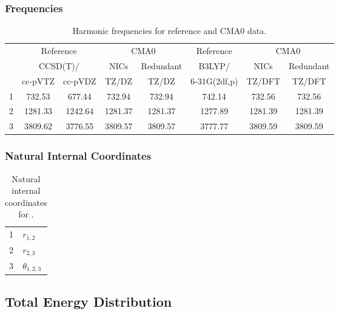 \documentclass[10pt,oneside]{article}
\begin{document}
\begin{table}[h!]
\subsubsection*{Frequencies}
\centering
\caption{Harmonic frequencies for reference and CMA0 data.}
\begin{tabular}{cccccccc}
\toprule
{} & \multicolumn{2}{c}{Reference} & \multicolumn{2}{c}{CMA0} &    Reference & \multicolumn{2}{c}{CMA0} \\
{} & \multicolumn{2}{c}{CCSD(T)/} &    NICs &  Redundant &       B3LYP/ &    NICs & Redundant \\
{} &   cc-pVTZ & cc-pVDZ &   TZ/DZ &      TZ/DZ & 6-31G(2df,p) &  TZ/DFT &    TZ/DFT \\
\midrule
1 &    732.53 &  677.44 &  732.94 &     732.94 &       742.14 &  732.56 &    732.56 \\
2 &   1281.33 & 1242.64 & 1281.37 &    1281.37 &      1277.89 & 1281.39 &   1281.39 \\
3 &   3809.62 & 3776.55 & 3809.57 &    3809.57 &      3777.77 & 3809.59 &   3809.59 \\
\bottomrule
\end{tabular}
\end{table}

\begin{table}[h!]
\subsubsection*{Natural Internal Coordinates}
\centering
\caption{Natural internal coordinates for .}
\small
\begin{tabular}{ll}
\toprule
  1   & $r_{1,2}$ \\
  2   & $r_{2,3}$ \\
  3   & $\theta_{1,2,3}$ \\
\bottomrule
\end{tabular}
\end{table}

\begin{table}
\subsection*{Total Energy Distribution}
\centering\end{table}

\clearpage

\subsection{}
\end{document}
